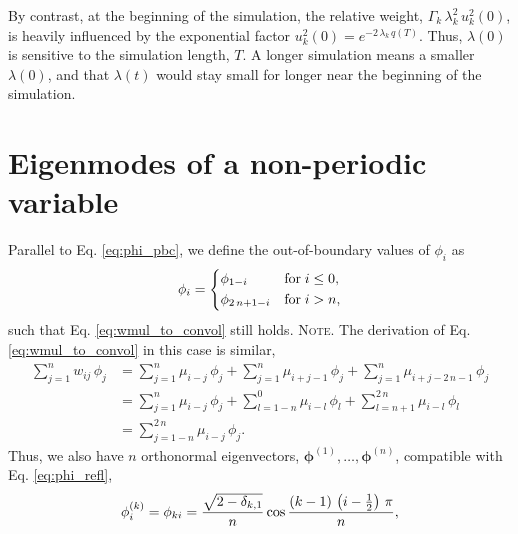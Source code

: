\documentclass[reprint, floatfix]{revtex4-1}
\newcommand{\note}[1]{{\color{DarkGreen}\footnotesize \textsc{Note.} #1}}
\begin{document}
By contrast,
at the beginning of the simulation,
the relative weight, $\Gamma_k \, \lambda_k^2 \, u_k^2(0)$,
is heavily influenced by the exponential factor
$u_k^2(0) = e^{ -2 \, \lambda_k \, q(T) }$.
%
Thus, $\lambda(0)$
is sensitive to the simulation length, $T$.
%
A longer simulation means a smaller $\lambda(0)$,
and that $\lambda(t)$ would stay small
for longer near the beginning of the simulation.






\section{
Eigenmodes of a non-periodic variable}




Parallel to Eq. \eqref{eq:phi_pbc},
we define the out-of-boundary values
of $\phi_i$ as
%
\begin{equation}
  \phi_i
  =
  \begin{dcases}
    \phi_{ 1 - i }           & \mathrm{for \;} i \le 0, \\
    \phi_{ 2 \, n + 1 - i }  & \mathrm{for \;} i > n,
  \end{dcases}
\label{eq:phi_refl}
\end{equation}
%
such that Eq. \eqref{eq:wmul_to_convol}
still holds.
%
\note{The derivation of Eq. \eqref{eq:wmul_to_convol}
  in this case is similar,
  $$
  \begin{aligned}
    \sum_{j = 1}^n w_{ij} \, \phi_j
    &=
    \sum_{j = 1}^n
      \mu_{i - j} \, \phi_j
    +
    \sum_{j = 1}^n
      \mu_{i + j - 1} \, \phi_j
    +
    \sum_{j = 1}^n
      \mu_{i + j - 2 \, n - 1} \, \phi_j
    \\
    &=
    \sum_{j = 1}^n
      \mu_{i - j} \, \phi_j
    +
    \sum_{l = 1 - n}^0
      \mu_{i - l} \, \phi_l
    +
    \sum_{l = n + 1}^{ 2 \, n }
      \mu_{i - l} \, \phi_l
    \\
    &=
    \sum_{j = 1 - n}^{ 2 \, n}
      \mu_{i - j} \, \phi_j.
  \end{aligned}
  $$
}%
Thus, we also have $n$ orthonormal eigenvectors,
$\pmb\phi^{(1)}, \dots, \pmb\phi^{(n)}$,
compatible with Eq. \eqref{eq:phi_refl},
%
\begin{equation}
  \phi^{(k)}_i
  =
  \phi_{k i}
  =
  \frac{ \sqrt{ 2 - \delta_{k, 1} } }
       {             n              }
  \cos \frac{ ( k - 1) \, \left( i - \frac 1 2 \right) \, \pi}
            {                    n                           }
  ,
\notag
\end{equation}
\end{document}

